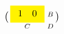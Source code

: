 \documentclass{article}
\begin{document}
\[ \bigl(\begin{smallmatrix}
\colorbox{yellow}{$\begin{array}{cc}1 &0\end{array}$} & B\\ C & D
\end{smallmatrix}\bigr) \]
\end{document}
